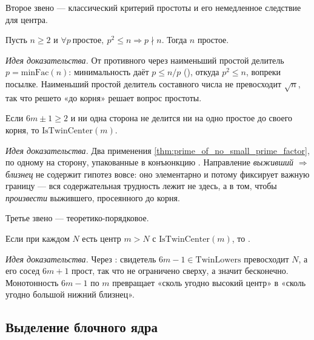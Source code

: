 Второе звено --- классический критерий простоты и его немедленное следствие для центра.

\begin{theorem}\label{thm:prime_of_no_small_prime_factor}
Пусть $n\ge 2$ и $\forall p\ \text{простое},\ p^2\le n\Rightarrow p\nmid n$. Тогда $n$ простое.
\end{theorem}

\emph{Идея доказательства.} От противного через наименьший простой делитель $p=\mathrm{minFac}(n)$:
минимальность даёт $p\le n/p$ (), откуда $p^2\le n$, вопреки посылке.
Наименьший простой делитель составного числа не превосходит $\sqrt n$, так что решето «до корня»
решает вопрос простоты. \green{}

\begin{theorem}\label{thm:isTwinCenter_of_root_sieve}
Если $6m\pm1\ge 2$ и ни одна сторона не делится ни на одно простое до своего корня, то
$\mathrm{IsTwinCenter}(m)$.
\end{theorem}

\emph{Идея доказательства.} Два применения \cref{thm:prime_of_no_small_prime_factor}, по одному на
сторону, упакованные в конъюнкцию . Направление \emph{выживший $\Rightarrow$
близнец} не содержит гипотез вовсе: оно элементарно и потому фиксирует важную границу --- вся
содержательная трудность лежит не здесь, а в том, чтобы \emph{произвести} выжившего, просеянного до
корня. \green{}

Третье звено --- теоретико-порядковое.

\begin{theorem}\label{thm:infinite_of_unbounded_centers}
Если при каждом $N$ есть центр $m>N$ с $\mathrm{IsTwinCenter}(m)$, то .
\end{theorem}

\emph{Идея доказательства.} Через : свидетель
$6m-1\in\mathrm{TwinLowers}$ превосходит $N$, а его сосед $6m+1$ прост, так что 
не ограничено сверху, а значит бесконечно. Монотонность $6m-1$ по $m$ превращает «сколь угодно
высокий центр» в «сколь угодно большой нижний близнец». \green{}

\subsection{Выделение блочного ядра}

